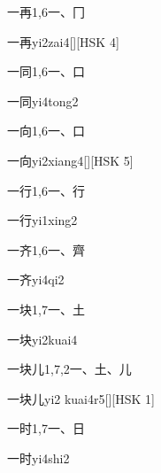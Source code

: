 \begin{entry}{一再}{1,6}{⼀、⼌}
  \begin{phonetics}{一再}{yi2zai4}[][HSK 4]
  \end{phonetics}
\end{entry}

\begin{entry}{一同}{1,6}{⼀、⼝}
  \begin{phonetics}{一同}{yi4tong2}
  \end{phonetics}
\end{entry}

\begin{entry}{一向}{1,6}{⼀、⼝}
  \begin{phonetics}{一向}{yi2xiang4}[][HSK 5]
  \end{phonetics}
\end{entry}

\begin{entry}{一行}{1,6}{⼀、⾏}
  \begin{phonetics}{一行}{yi1xing2}
  \end{phonetics}
\end{entry}

\begin{entry}{一齐}{1,6}{⼀、⿑}
  \begin{phonetics}{一齐}{yi4qi2}
  \end{phonetics}
\end{entry}

\begin{entry}{一块}{1,7}{⼀、⼟}
  \begin{phonetics}{一块}{yi2kuai4}
  \end{phonetics}
\end{entry}

\begin{entry}{一块儿}{1,7,2}{⼀、⼟、⼉}
  \begin{phonetics}{一块儿}{yi2 kuai4r5}[][HSK 1]
  \end{phonetics}
\end{entry}

\begin{entry}{一时}{1,7}{⼀、⽇}
  \begin{phonetics}{一时}{yi4shi2}
  \end{phonetics}
\end{entry}

